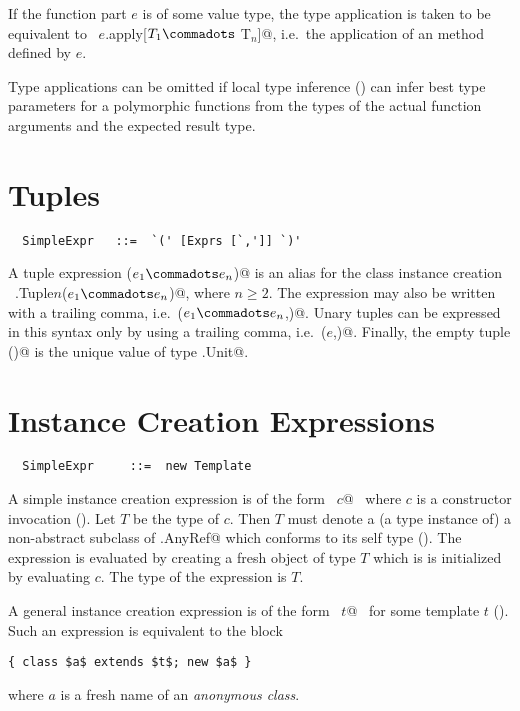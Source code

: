 If the function part $e$ is of some value type, the type application
is taken to be equivalent to 
~\lstinline@$e$.apply[$T_1 \commadots$ T$_n$]@, i.e.\ the application of an  method defined by
$e$.

Type applications can be omitted if local type inference
() can infer best type parameters for a
polymorphic functions from the types of the actual function arguments
and the expected result type.

\section{Tuples}
\label{sec:tuples}

\syntax\begin{lstlisting}
  SimpleExpr   ::=  `(' [Exprs [`,']] `)'
\end{lstlisting}

A tuple expression \lstinline@($e_1 \commadots e_n$)@ is an alias
for the class instance creation 
~\lstinline@scala.Tuple$n$($e_1 \commadots e_n$)@, where $n \geq 2$.  
The expression may also be written
with a trailing comma, i.e.\ \lstinline@($e_1 \commadots e_n$,)@.
Unary tuples can be expressed in
this syntax only by using a trailing comma,
i.e.\ \lstinline@($e$,)@. Finally, the empty tuple
\lstinline@()@ is the unique value of type \lstinline@scala.Unit@.

\section{Instance Creation Expressions}
\label{sec:inst-creation}

\syntax\begin{lstlisting}
  SimpleExpr     ::=  new Template
\end{lstlisting}

A simple instance creation expression is of the form ~\lstinline@new $c$@~ 
where $c$ is a constructor invocation
().  Let $T$ be the type of $c$. Then $T$ must
denote a (a type instance of) a non-abstract subclass of
\lstinline@scala.AnyRef@ which conforms to its self type
(). The expression is evaluated by creating a fresh
object of type $T$ which is is initialized by evaluating $c$. The
type of the expression is $T$.

A general instance creation expression is of the form 
~\lstinline@new $t$@~ for some template $t$ ().
Such an expression is equivalent to the block
\begin{lstlisting}
{ class $a$ extends $t$; new $a$ }
\end{lstlisting}
where $a$ is a fresh name of an {\em anonymous class}.

